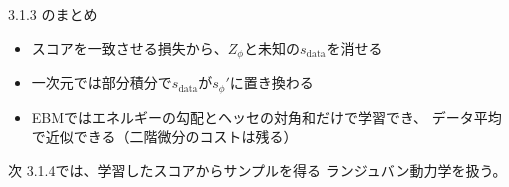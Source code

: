 \asmain
\begin{frame}{3.1.3 のまとめ}
    \begin{itemize}
        \item スコアを一致させる損失から、$Z_\phi$と未知の$s_{\mathrm{data}}$を消せる
        \item 一次元では部分積分で$s_{\mathrm{data}}$が$s_\phi'$に置き換わる
        \item EBMではエネルギーの勾配とヘッセの対角和だけで学習でき、
        データ平均で近似できる（二階微分のコストは残る）
    \end{itemize}
    \begin{block}{次}
        3.1.4では、学習したスコアからサンプルを得る
        ランジュバン動力学を扱う。
    \end{block}
\end{frame}
